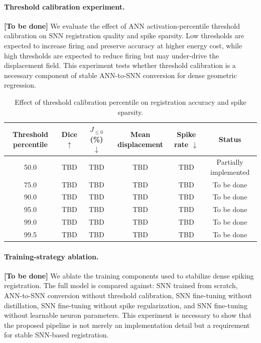 \paragraph{Threshold calibration experiment.}
\textbf{[To be done]} We evaluate the effect of ANN activation-percentile threshold calibration on SNN registration quality and spike sparsity. Low thresholds are expected to increase firing and preserve accuracy at higher energy cost, while high thresholds are expected to reduce firing but may under-drive the displacement field. This experiment tests whether threshold calibration is a necessary component of stable ANN-to-SNN conversion for dense geometric regression.

\begin{table}[t]
\centering
\caption{Effect of threshold calibration percentile on registration accuracy and spike sparsity.}
\label{tab:threshold_ablation}
\begin{tabular}{cccccc}
\toprule
Threshold percentile & Dice $\uparrow$ & $J_{\leq0}$ (\%) $\downarrow$ & Mean displacement & Spike rate $\downarrow$ & Status \\
\midrule
50.0 & TBD & TBD & TBD & TBD & Partially implemented \\
75.0 & TBD & TBD & TBD & TBD & To be done \\
90.0 & TBD & TBD & TBD & TBD & To be done \\
95.0 & TBD & TBD & TBD & TBD & To be done \\
99.0 & TBD & TBD & TBD & TBD & To be done \\
99.5 & TBD & TBD & TBD & TBD & To be done \\
\bottomrule
\end{tabular}
\end{table}

\paragraph{Training-strategy ablation.}
\textbf{[To be done]} We ablate the training components used to stabilize dense spiking registration. The full model is compared against: SNN trained from scratch, ANN-to-SNN conversion without threshold calibration, SNN fine-tuning without distillation, SNN fine-tuning without spike regularization, and SNN fine-tuning without learnable neuron parameters. This experiment is necessary to show that the proposed pipeline is not merely an implementation detail but a requirement for stable SNN-based registration.

